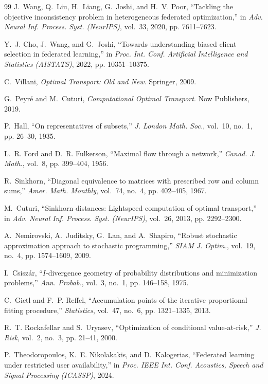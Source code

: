 \documentclass{article}
\theoremstyle{definition}
\begin{document}
\begin{thebibliography}{99}
J.~Wang, Q.~Liu, H.~Liang, G.~Joshi, and H.~V. Poor, ``Tackling the objective
inconsistency problem in heterogeneous federated optimization,'' in \emph{Adv.
Neural Inf. Process. Syst. (NeurIPS)}, vol.~33, 2020, pp. 7611--7623.

Y.~J. Cho, J.~Wang, and G.~Joshi, ``Towards understanding biased client
selection in federated learning,'' in \emph{Proc. Int. Conf. Artificial
Intelligence and Statistics (AISTATS)}, 2022, pp. 10351--10375.

C.~Villani, \emph{Optimal Transport: Old and New}. Springer, 2009.

G.~Peyr\'{e} and M.~Cuturi, \emph{Computational Optimal Transport}. Now
Publishers, 2019.

P.~Hall, ``On representatives of subsets,'' \emph{J. London Math. Soc.},
vol.~10, no.~1, pp. 26--30, 1935.

L.~R. Ford and D.~R. Fulkerson, ``Maximal flow through a network,'' \emph{Canad.
J. Math.}, vol.~8, pp. 399--404, 1956.

R.~Sinkhorn, ``Diagonal equivalence to matrices with prescribed row and column
sums,'' \emph{Amer. Math. Monthly}, vol.~74, no.~4, pp. 402--405, 1967.

M.~Cuturi, ``Sinkhorn distances: Lightspeed computation of optimal transport,''
in \emph{Adv. Neural Inf. Process. Syst. (NeurIPS)}, vol.~26, 2013, pp.
2292--2300.

A.~Nemirovski, A.~Juditsky, G.~Lan, and A.~Shapiro, ``Robust stochastic
approximation approach to stochastic programming,'' \emph{SIAM J. Optim.},
vol.~19, no.~4, pp. 1574--1609, 2009.

I.~Csisz\'{a}r, ``$I$-divergence geometry of probability distributions and
minimization problems,'' \emph{Ann. Probab.}, vol.~3, no.~1, pp. 146--158, 1975.

C.~Gietl and F.~P. Reffel, ``Accumulation points of the iterative proportional
fitting procedure,'' \emph{Statistics}, vol.~47, no.~6, pp. 1321--1335, 2013.

R.~T. Rockafellar and S.~Uryasev, ``Optimization of conditional value-at-risk,''
\emph{J. Risk}, vol.~2, no.~3, pp. 21--41, 2000.

P.~Theodoropoulos, K.~E. Nikolakakis, and D.~Kalogerias, ``Federated learning
under restricted user availability,'' in \emph{Proc. IEEE Int. Conf. Acoustics,
Speech and Signal Processing (ICASSP)}, 2024.


\end{thebibliography}
\end{document}
